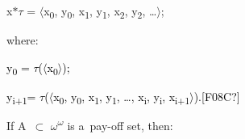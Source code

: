 x$*{\tau}$ = ${\langle}$x\textsubscript{0}, y\textsubscript{0}, x\textsubscript{1}, y\textsubscript{1}, x\textsubscript{2}, y\textsubscript{2}, …${\rangle}$;


where:

\textcolor{black}{y}\textcolor{black}{\textsubscript{0 }}\textcolor{black}{= ${\tau}$(${\langle}$x}\textcolor{black}{\textsubscript{0}}\textcolor{black}{${\rangle}$);}

\textcolor{black}{y}\textcolor{black}{\textsubscript{i+1}}\textcolor{black}{= ${\tau}$(${\langle}$x}\textcolor{black}{\textsubscript{0}}\textcolor{black}{, y}\textcolor{black}{\textsubscript{0}}\textcolor{black}{, x}\textcolor{black}{\textsubscript{1}}\textcolor{black}{, y}\textcolor{black}{\textsubscript{1}}\textcolor{black}{, …, x}\textcolor{black}{\textsubscript{i}}\textcolor{black}{, y}\textcolor{black}{\textsubscript{i}}\textcolor{black}{, x}\textcolor{black}{\textsubscript{i+1}}\textcolor{black}{${\rangle}$).[F08C?]}

If A~${\subset}$ ${\omega}$\textsuperscript{${\omega}$ }is a~pay-off set, then:

